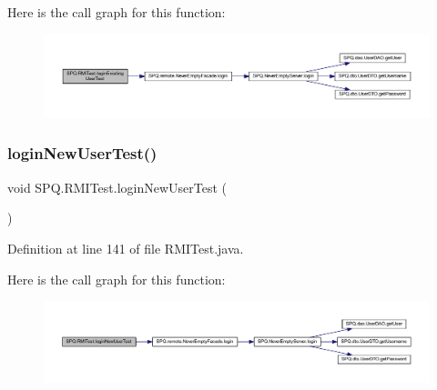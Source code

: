 Here is the call graph for this function\+:\nopagebreak
\begin{figure}[H]
\begin{center}
\leavevmode
\includegraphics[width=350pt]{class_s_p_q_1_1_r_m_i_test_a0e9430910652b8ebeb99d2e871476ff1_cgraph}
\end{center}
\end{figure}
\mbox{\label{class_s_p_q_1_1_r_m_i_test_a07409afe054b3fd3ee0481236e45b680}} 
\subsubsection{\texorpdfstring{login\+New\+User\+Test()}{loginNewUserTest()}}
{\footnotesize\ttfamily void S\+P\+Q.\+R\+M\+I\+Test.\+login\+New\+User\+Test (\begin{DoxyParamCaption}{ }\end{DoxyParamCaption})}



Definition at line 141 of file R\+M\+I\+Test.\+java.

Here is the call graph for this function\+:\nopagebreak
\begin{figure}[H]
\begin{center}
\leavevmode
\includegraphics[width=350pt]{class_s_p_q_1_1_r_m_i_test_a07409afe054b3fd3ee0481236e45b680_cgraph}
\end{center}
\end{figure}
\mbox{\label{class_s_p_q_1_1_r_m_i_test_aebfcce491b9fa13cafa971bac73f88b8}} 
